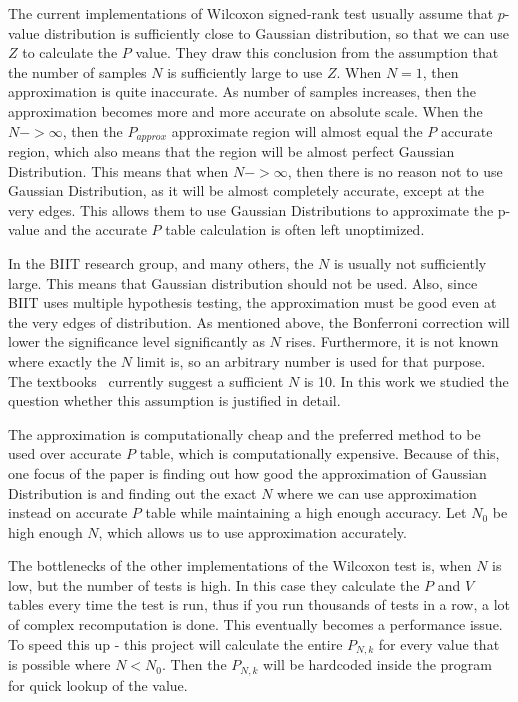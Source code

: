 \documentclass[12pt]{article}
\begin{document}
{The current implementations of Wilcoxon signed-rank test usually assume that $p$-value distribution is sufficiently close to Gaussian distribution, so that we can use $Z$ to calculate the $P$ value. They draw this conclusion from the assumption that the number of samples $N$ is sufficiently large to use $Z$. When $N = 1$, then approximation is quite inaccurate. As number of samples increases, then the approximation becomes more and more accurate on absolute scale. When the $N->\infty$, then the $P_{approx}$ approximate region will almost equal the $P$ accurate region, which also means that the region will be almost perfect Gaussian Distribution. This means that when $N->\infty$, then there is no reason not to use Gaussian Distribution, as it will be almost completely accurate, except at the very edges. This allows them to use Gaussian Distributions to approximate the p-value and the accurate $P$ table calculation is often left unoptimized.

In the BIIT research group, and many others, the $N$ is usually not sufficiently large. This means that Gaussian distribution should not be used. Also, since BIIT uses multiple hypothesis testing, the approximation must be good even at the very edges of distribution. As mentioned above, the Bonferroni correction will lower the significance level significantly as $N$ rises. Furthermore, it is not known where exactly the $N$ limit is, so an arbitrary number is used for that purpose. The textbooks~\cite{lowry_concepts} currently suggest a sufficient $N$ is 10. In this work we studied the question whether this assumption is justified in detail.

The approximation is computationally cheap and the preferred method to be used over accurate $P$ table, which is computationally expensive. Because of this, one focus of the paper is finding out how good the approximation of Gaussian Distribution is and finding out the exact $N$ where we can use approximation instead on accurate $P$ table while maintaining a high enough accuracy. Let $N_0$ be high enough $N$, which allows us to use approximation accurately.

The bottlenecks of the other implementations of the Wilcoxon test is, when $N$ is low, but the number of tests is high. In this case they calculate the $P$ and $V$ tables every time the test is run, thus if you run thousands of tests in a row, a lot of complex recomputation is done. This eventually becomes a performance issue. To speed this up - this project will calculate the entire $P_{N, k}$ for every value that is possible where $N < N_0$. Then the $P_{N, k}$ will be hardcoded inside the program for quick lookup of the value.


}
\end{document}
